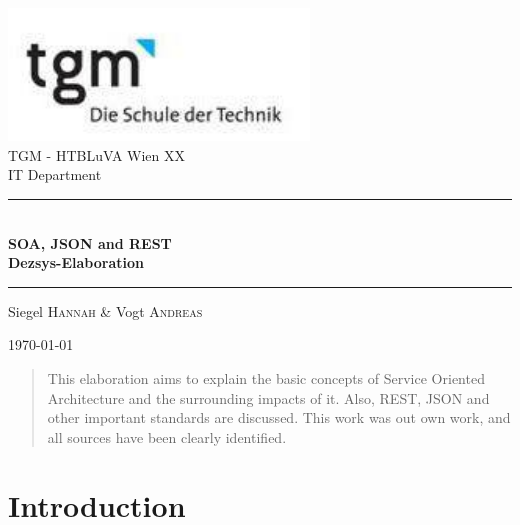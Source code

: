 \documentclass[12pt]{article}
\begin{document}
\begin{titlepage}
\begin{center}
\includegraphics[width=0.6\textwidth]{images/logo}\\[1cm]    



\LARGE TGM - HTBLuVA Wien XX \\ IT Department  \\[1.5cm]

\rule{1.0\textwidth}{1mm}
{ \huge \bfseries \\[0.4cm]  \huge SOA, JSON and REST \\ \LARGE Dezsys-Elaboration \\[0.4cm] }

\rule{1.0\textwidth}{1mm}


\noindent 
\vspace{0.5cm}


\small
\begin{center}
\large
Siegel \textsc{Hannah} \&
Vogt \textsc{Andreas}
\end{center}

{\large \today}
\normalsize
\vfill
\begin{abstract}This elaboration aims to explain the basic concepts of Service Oriented Architecture and the surrounding impacts of it. Also, REST, JSON and other important standards are discussed. This work was out own work, and all sources have been clearly identified.
\end{abstract}

\end{center}
\end{titlepage}
\small
\tableofcontents
\normalsize

\ohead{\headmark}

\newpage

\section{Introduction}
\end{document}
